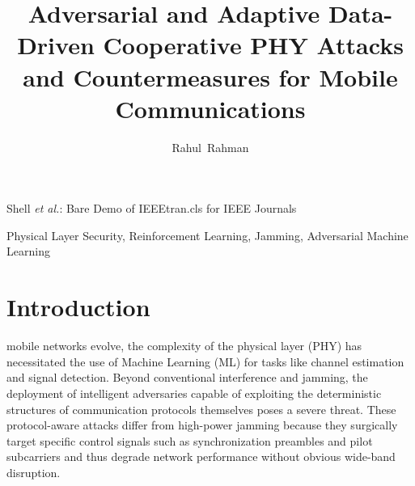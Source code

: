 \documentclass[journal]{IEEEtran}
\newcommand{\adm}[1]{{\color{orange}{[#1]}}}
\newcommand{\rar}[1]{{\color{blue}{[#1]}}}
\begin{document}
\title{Adversarial and Adaptive Data-Driven Cooperative PHY Attacks and Countermeasures for Mobile Communications}

\author{Rahul~Rahman}%

%
{Shell \MakeLowercase{\textit{et al.}}: Bare Demo of IEEEtran.cls for IEEE Journals}

\maketitle

\begin{abstract}
\rar{Write last.}
\end{abstract}


\begin{IEEEkeywords}
Physical Layer Security, Reinforcement Learning, Jamming, Adversarial Machine Learning
\end{IEEEkeywords}






%
\IEEEpeerreviewmaketitle


\section{Introduction}
 mobile networks evolve, the complexity of the physical layer (PHY) has necessitated the use of Machine Learning (ML) for tasks like channel estimation and signal detection. Beyond conventional interference and jamming, the deployment of intelligent adversaries capable of exploiting the deterministic structures of communication protocols themselves poses a severe threat.
These protocol-aware attacks differ from high-power jamming because they surgically target specific control signals such as synchronization preambles and pilot subcarriers and thus degrade network performance without obvious wide-band disruption.
\end{document}

